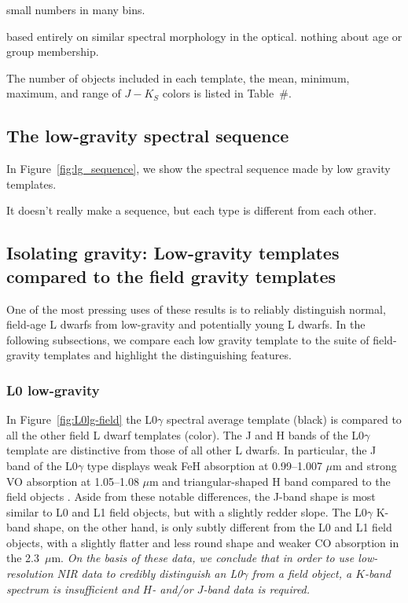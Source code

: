 \documentclass[12pt,preprint]{aastex}
\begin{document}
small numbers in many bins.

based entirely on similar spectral morphology in the optical. nothing about age or group membership.

The number of objects included in each template, the mean, minimum, maximum, and range of $J-K_S$ colors is listed in Table~\#. 

\subsection{The low-gravity spectral sequence}

In Figure~\ref{fig:lg_sequence}, we show the spectral sequence made by low gravity templates.

It doesn't really make a sequence, but each type is different from each other.

\subsection{Isolating gravity: Low-gravity templates compared to the field gravity templates} 

One of the most pressing uses of these results is to reliably distinguish normal, field-age L dwarfs from low-gravity and potentially young L dwarfs. %
In the following subsections, we compare each low gravity template to the suite of field-gravity templates and highlight the distinguishing features.

\subsubsection{L0 low-gravity}
In Figure~\ref{fig:L0lg-field} the L0$\gamma$ spectral average template (black) is compared to all the other field L dwarf templates (color).  
The J and H bands of the L0$\gamma$ template are distinctive from those of all other L dwarfs. 
In particular, the J band of the L0$\gamma$ type displays weak FeH absorption at 0.99--1.007 $\mu$m and strong VO absorption at 1.05--1.08 $\mu$m and triangular-shaped H band compared to the field objects \cite{Kirkpatrick06}. 
Aside from these notable differences, the J-band shape is most similar to L0 and L1 field objects, but with a slightly redder slope. 
The L0$\gamma$ K-band shape, on the other hand, is only subtly different from the L0 and L1 field objects, with a slightly flatter and less round shape and weaker CO absorption in the 2.3~$\mu$m. 
\emph{On the basis of these data, we conclude that in order to use low-resolution NIR data to credibly distinguish an L0$\gamma$ from a field object, a $K$-band spectrum is insufficient and $H$- and/or $J$-band data is required.}
\end{document}
